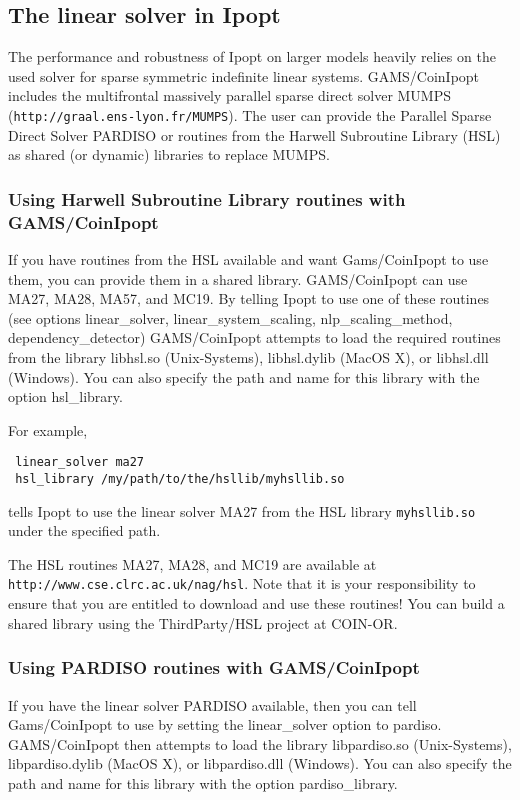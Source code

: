 \subsection{The linear solver in Ipopt}
\label{ipoptlinearsolver}
\hypertarget{ipoptlinearsolver}{}

The performance and robustness of Ipopt on larger models heavily relies on the used solver for sparse symmetric indefinite linear systems.
GAMS/CoinIpopt includes the multifrontal massively parallel sparse direct solver MUMPS (\texttt{http://graal.ens-lyon.fr/MUMPS}).
The user can provide the Parallel Sparse Direct Solver PARDISO or routines from the Harwell Subroutine Library (HSL) as shared (or dynamic) libraries to replace MUMPS.

\subsubsection{Using Harwell Subroutine Library routines with GAMS/CoinIpopt}

If you have routines from the HSL available and want Gams/CoinIpopt to use them, you can provide them in a shared library.
GAMS/CoinIpopt can use MA27, MA28, MA57, and MC19.
By telling Ipopt to use one of these routines (see options linear\_solver, linear\_system\_scaling, nlp\_scaling\_method, dependency\_detector) GAMS/CoinIpopt attempts to load the required routines from the library libhsl.so (Unix-Systems), libhsl.dylib (MacOS X), or libhsl.dll (Windows).
You can also specify the path and name for this library with the option hsl\_library.

For example,
\begin{verbatim}
 linear_solver ma27
 hsl_library /my/path/to/the/hsllib/myhsllib.so
\end{verbatim}
tells Ipopt to use the linear solver MA27 from the HSL library \verb=myhsllib.so= under the specified path.

The HSL routines MA27, MA28, and MC19 are available at \texttt{http://www.cse.clrc.ac.uk/nag/hsl}.
Note that it is your responsibility to ensure that you are entitled to download and use these routines!
You can build a shared library using the ThirdParty/HSL project at COIN-OR.

\subsubsection{Using PARDISO routines with GAMS/CoinIpopt}

If you have the linear solver PARDISO available, then you can tell Gams/CoinIpopt to use by setting the linear\_solver option to pardiso.
GAMS/CoinIpopt then attempts to load the library libpardiso.so (Unix-Systems), libpardiso.dylib (MacOS X), or libpardiso.dll (Windows).
You can also specify the path and name for this library with the option pardiso\_library.

